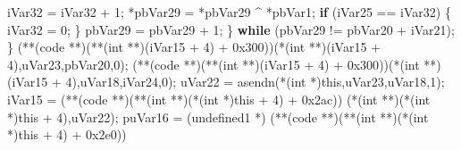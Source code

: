 \documentclass[
]{article}
\newenvironment{Shaded}{}{}
\newcommand{\BaseNTok}[1]{\textcolor[rgb]{0.25,0.63,0.44}{#1}}
\newcommand{\ControlFlowTok}[1]{\textcolor[rgb]{0.00,0.44,0.13}{\textbf{#1}}}
\newcommand{\DataTypeTok}[1]{\textcolor[rgb]{0.56,0.13,0.00}{#1}}
\newcommand{\DecValTok}[1]{\textcolor[rgb]{0.25,0.63,0.44}{#1}}
\newcommand{\NormalTok}[1]{#1}
\newcommand{\OperatorTok}[1]{\textcolor[rgb]{0.40,0.40,0.40}{#1}}
\begin{document}
\begin{Shaded}
\begin{Highlighting}[]
\NormalTok{          iVar32 }\OperatorTok{=}\NormalTok{ iVar32 }\OperatorTok{+} \DecValTok{1}\OperatorTok{;}
          \OperatorTok{*}\NormalTok{pbVar29 }\OperatorTok{=} \OperatorTok{*}\NormalTok{pbVar29 }\OperatorTok{\^{}} \OperatorTok{*}\NormalTok{pbVar1}\OperatorTok{;}
          \ControlFlowTok{if} \OperatorTok{(}\NormalTok{iVar25 }\OperatorTok{==}\NormalTok{ iVar32}\OperatorTok{)} \OperatorTok{\{}
\NormalTok{            iVar32 }\OperatorTok{=} \DecValTok{0}\OperatorTok{;}
          \OperatorTok{\}}
\NormalTok{          pbVar29 }\OperatorTok{=}\NormalTok{ pbVar29 }\OperatorTok{+} \DecValTok{1}\OperatorTok{;}
        \OperatorTok{\}} \ControlFlowTok{while} \OperatorTok{(}\NormalTok{pbVar29 }\OperatorTok{!=}\NormalTok{ pbVar20 }\OperatorTok{+}\NormalTok{ iVar21}\OperatorTok{);}
      \OperatorTok{\}}
      \OperatorTok{(**(}\NormalTok{code }\OperatorTok{**)(**(}\DataTypeTok{int} \OperatorTok{**)(}\NormalTok{iVar15 }\OperatorTok{+} \DecValTok{4}\OperatorTok{)} \OperatorTok{+} \BaseNTok{0x300}\OperatorTok{))(*(}\DataTypeTok{int} \OperatorTok{**)(}\NormalTok{iVar15 }\OperatorTok{+} \DecValTok{4}\OperatorTok{),}\NormalTok{uVar23}\OperatorTok{,}\NormalTok{pbVar20}\OperatorTok{,}\DecValTok{0}\OperatorTok{);}
      \OperatorTok{(**(}\NormalTok{code }\OperatorTok{**)(**(}\DataTypeTok{int} \OperatorTok{**)(}\NormalTok{iVar15 }\OperatorTok{+} \DecValTok{4}\OperatorTok{)} \OperatorTok{+} \BaseNTok{0x300}\OperatorTok{))(*(}\DataTypeTok{int} \OperatorTok{**)(}\NormalTok{iVar15 }\OperatorTok{+} \DecValTok{4}\OperatorTok{),}\NormalTok{uVar18}\OperatorTok{,}\NormalTok{iVar24}\OperatorTok{,}\DecValTok{0}\OperatorTok{);}
\NormalTok{      uVar22 }\OperatorTok{=}\NormalTok{ asendn}\OperatorTok{(*(}\DataTypeTok{int} \OperatorTok{*)}\NormalTok{this}\OperatorTok{,}\NormalTok{uVar23}\OperatorTok{,}\NormalTok{uVar18}\OperatorTok{,}\DecValTok{1}\OperatorTok{);}
\NormalTok{      iVar15 }\OperatorTok{=} \OperatorTok{(**(}\NormalTok{code }\OperatorTok{**)(**(}\DataTypeTok{int} \OperatorTok{**)(*(}\DataTypeTok{int} \OperatorTok{*)}\NormalTok{this }\OperatorTok{+} \DecValTok{4}\OperatorTok{)} \OperatorTok{+} \BaseNTok{0x2ac}\OperatorTok{))}
                         \OperatorTok{(*(}\DataTypeTok{int} \OperatorTok{**)(*(}\DataTypeTok{int} \OperatorTok{*)}\NormalTok{this }\OperatorTok{+} \DecValTok{4}\OperatorTok{),}\NormalTok{uVar22}\OperatorTok{);}
\NormalTok{      puVar16 }\OperatorTok{=} \OperatorTok{(}\NormalTok{undefined1 }\OperatorTok{*)}
                \OperatorTok{(**(}\NormalTok{code }\OperatorTok{**)(**(}\DataTypeTok{int} \OperatorTok{**)(*(}\DataTypeTok{int} \OperatorTok{*)}\NormalTok{this }\OperatorTok{+} \DecValTok{4}\OperatorTok{)} \OperatorTok{+} \BaseNTok{0x2e0}\OperatorTok{))}

\end{Highlighting}
\end{Shaded}
\end{document}
